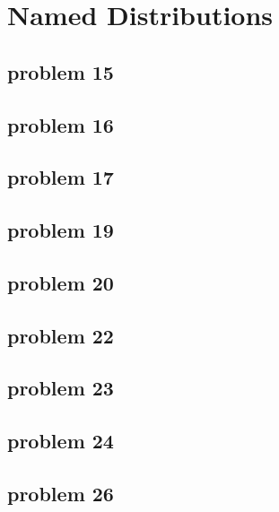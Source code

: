 \section{Named Distributions}

\subsection{problem 15}


\subsection{problem 16}


\subsection{problem 17}


\subsection{problem 19}


\subsection{problem 20}


\subsection{problem 22}


\subsection{problem 23}


\subsection{problem 24}


\subsection{problem 26}
